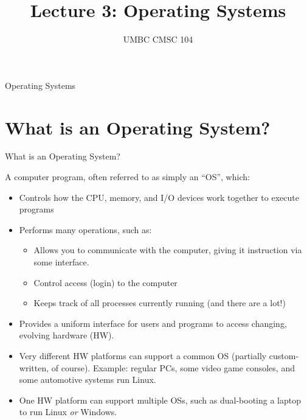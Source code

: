 \documentclass[graphics]{beamer}
\title{Lecture 3: Operating Systems}
\author{UMBC CMSC 104}
\date{}
\begin{document}
\begin{frame}{}
\centering
    Operating Systems
\end{frame}


\section{What is an Operating System?}
\begin{frame}{What is an Operating System?}
     {
        A computer program, often referred to as simply an ``OS'', which:
        \begin{itemize}
            \item Controls how the CPU, memory, and I/O devices work together to execute programs
            \item Performs many operations, such as:
            \begin{itemize}
                \item Allows you to communicate with the computer, giving it instruction via some interface.
                \item Control access (login) to the computer
                \item Keeps track of all processes currently running (and there are a lot!)
            \end{itemize}
        \end{itemize}
    }
     {
        \begin{itemize}
            \item Provides a uniform interface for users and programs to access changing, evolving hardware (HW).
            \item Very different HW platforms can support a common OS (partially custom-written, of course). Example: regular PCs, some video game consoles, and some automotive systems run Linux.
            \item One HW platform can support multiple OSs, such as dual-booting a laptop to run Linux \textit{or} Windows.
        \end{itemize}
    }
\end{frame}
\end{document}
